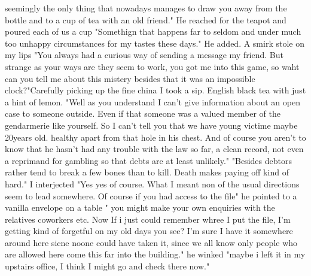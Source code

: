 seemingly the only thing that nowadays manages to draw you away from the bottle and to a cup of tea with an old friend." He reached for the teapot and poured each of us a cup "Somethign that happens far to seldom and under much too unhappy circumstances for my tastes these days." He added. A smirk stole on my lips "You always had a curious way of sending a message my friend. But strange as your ways are they seem to work, you got me into this game, so waht can you tell me about this mistery besides that it was an impossible clock?"Carefully picking up the fine china I took a sip. English black tea with just a hint of lemon. "Well as you understand I can't give information about an open case to someone outside. Even if that someone was a valued member of the gendarmerie like yourself. So I can't tell you that we have young victime maybe 20years old. healthy apart from that hole in his chest. And of course you aren't to know that he hasn't had any trouble with the law so far, a clean record, not even a reprimand for gambling so that debts are at least unlikely." "Besides debtors rather tend to break a few bones than to kill. Death makes paying off kind of hard." I interjected "Yes yes of course. What I meant non of the usual directions seem to lead somewhere. Of course if you had access to the file" he pointed to a vanilla envelope on a table " you might make your own enquiries with the relatives coworkers etc. Now If i just could remember whree I put the file, I'm getting kind of forgetful on my old days you see? I'm sure I have it somewhere around here sicne noone could have taken it, since we all know only people who are allowed here come this far into the building." he winked "maybe i left it in my upstairs office, I think I might go and check there now."
